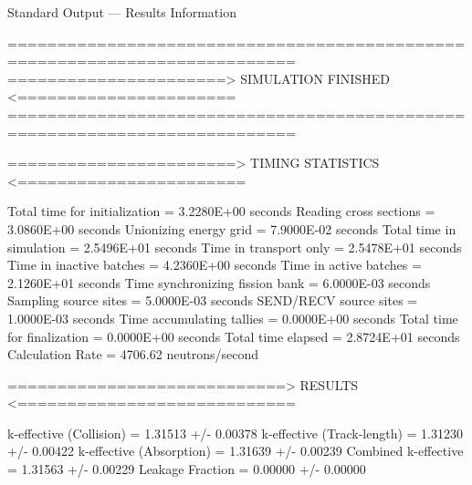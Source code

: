 \documentclass[serif]{beamer}
\begin{document}

\begin{frame}[fragile]{Standard Output --- Results Information}
    \begingroup
    \fontsize{6pt}{6.8pt}\selectfont
    \begin{semiverbatim}
 ===========================================================================
 ======================>     SIMULATION FINISHED     <======================
 ===========================================================================


 =======================>     TIMING STATISTICS     <=======================

 Total time for initialization     =  3.2280E+00 seconds
   Reading cross sections          =  3.0860E+00 seconds
   Unionizing energy grid          =  7.9000E-02 seconds
 Total time in simulation          =  2.5496E+01 seconds
   Time in transport only          =  2.5478E+01 seconds
   Time in inactive batches        =  4.2360E+00 seconds
   Time in active batches          =  2.1260E+01 seconds
   Time synchronizing fission bank =  6.0000E-03 seconds
     Sampling source sites         =  5.0000E-03 seconds
     SEND/RECV source sites        =  1.0000E-03 seconds
   Time accumulating tallies       =  0.0000E+00 seconds
 Total time for finalization       =  0.0000E+00 seconds
 Total time elapsed                =  2.8724E+01 seconds
 Calculation Rate                  =  4706.62 neutrons/second

 ============================>     RESULTS     <============================

 k-effective (Collision)     =  1.31513 +/-  0.00378
 k-effective (Track-length)  =  1.31230 +/-  0.00422
 k-effective (Absorption)    =  1.31639 +/-  0.00239
 Combined k-effective        =  1.31563 +/-  0.00229
 Leakage Fraction            =  0.00000 +/-  0.00000
    \end{semiverbatim}\endgroup
\end{frame}


\end{document}
